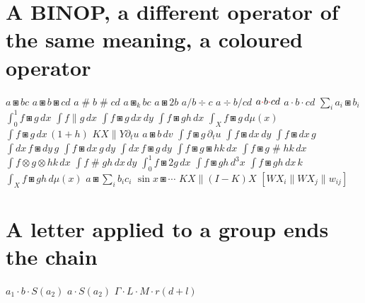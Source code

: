 \documentclass{article}
\begin{document}
\section{A BINOP, a different operator of the same meaning, a coloured operator}
$a\boxast b c$ $a\boxast b\boxast c d$ $a\mathbin{\#}b\mathbin{\#}c d$ $a\boxast_k b c$ $a\boxast 2b$ $a/b\div c$
$a\div b/c d$ $a{\color{red}\cdot}b{\color{red}\cdot}c d$ $a\mathbin{\cdot}b\mathbin{\cdot}c d$
$\sum_i a_i\boxast b_i$ $\int_0^1 f\boxast g\,dx$ $\int f\mathbin{\|}g\,dx$ $\int f\boxast g\,dx\,dy$ $\int f\boxast g h\,dx$
$\int_X f\boxast g\,d\mu(x)$ $\int f\boxast g\,dx\,(1+h)$ $K X\mathbin{\|}Y\partial_t u$ $a\boxast b\,dv$
$\int f\boxast g\,\partial_t u$ $\int f\boxast dx\,dy$ $\int f\boxast dx\,g$ $\int dx\,f\boxast dy\,g$ $\int f\boxast dx\,g\,dy$
$\int dx\,f\boxast g\,dy$
$\int f\boxast g\boxast h k\,dx$ $\int f\boxast g\mathbin{\#}h k\,dx$ $\int f\otimes g\otimes h k\,dx$
$\int f\mathbin{\#}g h\,dx\,dy$ $\int_0^1 f\boxast 2g\,dx$ $\int f\boxast g h\,d^3x$ $\int f\boxast g h\,dx\,k$ $\int_X f\boxast g h\,d\mu(x)$
$a\boxast\sum_i b_i c_i$ $\sin x\boxast\cdots$
$K X\mathbin{\|}(I-K)X$ $[W X_i\mathbin{\|}W X_j\mathbin{\|}w_{ij}]$

\section{A letter applied to a group ends the chain}
$a_1\cdot b\cdot S(a_2)$ $a\cdot S(a_2)$ $\Gamma\cdot L\cdot M\cdot r(d+l)$

\end{document}
